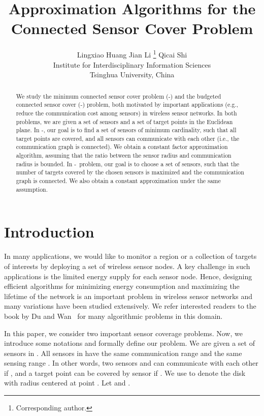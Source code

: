 \documentclass[11pt]{article}
\title{Approximation Algorithms for the Connected Sensor Cover Problem}
\author{Lingxiao Huang \quad\quad\quad\quad Jian Li \thanks{Corresponding author.}
	\quad \quad \quad \quad Qicai Shi  \\
Institute for Interdisciplinary Information Sciences\\
Tsinghua University, China \\
\mailsa
}
\newcommand{\mincsc}{-}
\newcommand{\bcsc}{-}
\begin{document}
\maketitle

\begin{abstract}
	We study the minimum connected sensor cover problem  (\mincsc) and
	the budgeted connected sensor cover  (\bcsc) problem,
both motivated by important applications (e.g., reduce the communication cost among sensors) in wireless sensor networks.
In both problems, we are given a set of sensors and a set of target points in the Euclidean plane.
In \mincsc, our goal is to find a set of sensors of minimum cardinality,
such that all target points are covered, and all sensors can communicate with each other (i.e., the communication graph is  connected). We obtain a constant factor approximation algorithm, assuming that the ratio between the sensor radius and communication radius is bounded.
In \bcsc\ problem, our goal is to choose a set of  sensors, such that the number of targets covered by the chosen sensors is maximized and the communication graph is connected. We also obtain a constant approximation under the same assumption.
\end{abstract}

\vspace{-0.2cm}
\section{Introduction}
\vspace{-0.2cm}

In many applications, we would like to monitor a region or a collection of targets of interests
by deploying a set of wireless sensor nodes.
A key challenge in such applications is the limited energy supply for each sensor node.
Hence, designing efficient algorithms for minimizing energy consumption and maximizing the lifetime of the network
is an important problem in wireless sensor networks and many variations have been studied extensively. We refer interested readers to the book by Du and Wan~\cite{du2012connected}
for many algorithmic problems in this domain.

In this paper, we consider two important sensor coverage problems.
Now, we introduce some notations and formally define our problem.
We are given a set  of  sensors in .
All sensors in  have the same communication range 
and the same sensing range .
In other words, two sensors  and  can communicate with each other
if , and a target point  can be covered by sensor 
if .
We use  to denote the disk with radius  centered at point .
Let  and .
\end{document}
